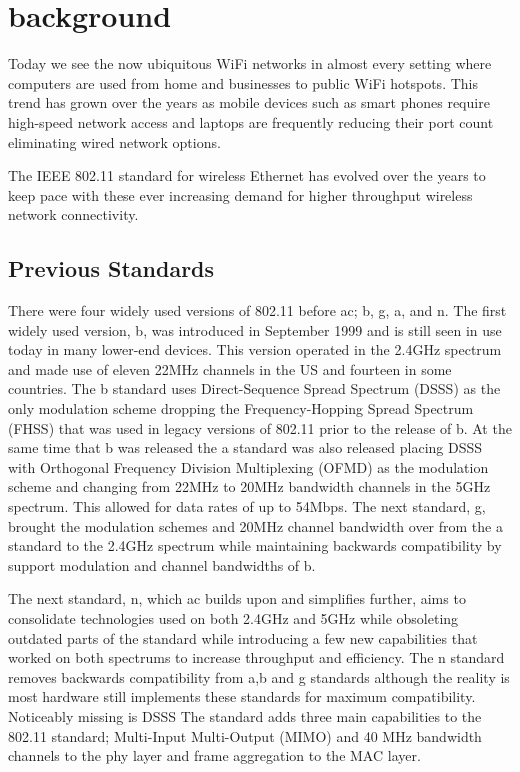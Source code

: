 \section{background}

Today we see the now ubiquitous WiFi networks in almost every setting where computers are used from home and businesses to public WiFi hotspots. This trend has grown over the years as mobile devices such as smart phones require high-speed network access and laptops are frequently reducing their port count eliminating wired network options.

The IEEE 802.11 standard for wireless Ethernet has evolved over the years to keep pace with these ever increasing demand for higher throughput wireless network connectivity.

\subsection{Previous Standards}

There were four widely used versions of 802.11 before ac; b, g, a, and n. The first widely used version, b, was introduced in September 1999 and is still seen in use today in many lower-end devices. This version operated in the 2.4GHz spectrum and made use of eleven 22MHz channels in the US and fourteen in some countries. The b standard uses Direct-Sequence Spread Spectrum (DSSS) as the only modulation scheme dropping the Frequency-Hopping Spread Spectrum (FHSS) that was used in legacy versions of 802.11 prior to the release of b. At the same time that b was released the a standard was also released placing DSSS with Orthogonal Frequency Division Multiplexing (OFMD) as the modulation scheme and changing from 22MHz to 20MHz bandwidth channels in the 5GHz spectrum. This allowed for data rates of up to 54Mbps. The next standard, g, brought the modulation schemes and 20MHz channel bandwidth over from the a standard to the 2.4GHz spectrum while maintaining backwards compatibility by support modulation and channel bandwidths of b. 

The next standard, n, which ac builds upon and simplifies further, aims to consolidate technologies used on both 2.4GHz and 5GHz while obsoleting outdated parts of the standard while introducing a few new capabilities that worked on both spectrums to increase throughput and efficiency. The n standard removes backwards compatibility from a,b and g standards although the reality is most hardware still implements these standards for maximum compatibility. Noticeably missing is DSSS The standard adds three main capabilities to the 802.11 standard; Multi-Input Multi-Output (MIMO) and 40 MHz bandwidth channels to the phy layer and frame aggregation to the MAC layer. 

